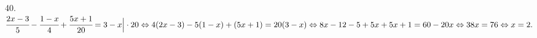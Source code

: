 40. $\cfrac{2x-3}{5}-\cfrac{1-x}{4}+\cfrac{5x+1}{20}=3-x\Big|\cdot20\Leftrightarrow 4(2x-3)-5(1-x)+(5x+1)=20(3-x)\Leftrightarrow
8x-12-5+5x+5x+1=60-20x\Leftrightarrow38x=76\Leftrightarrow x=2.$\\
